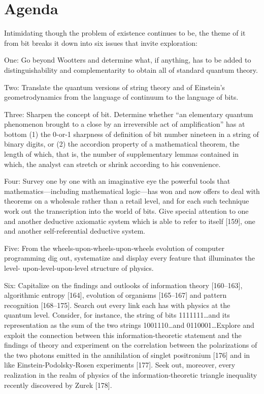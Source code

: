 \documentclass[11pt]{article}
\begin{document}
	\section{Agenda}
	Intimidating though the problem of existence continues to be, the theme of it from
	bit breaks it down into six issues that invite exploration:
	
	One: Go beyond Wootters and determine what, if anything, has to be added to
	distinguishability and complementarity to obtain all of standard quantum theory.
	
	Two: Translate the quantum versions of string theory and of Einstein's geometrodynamics from the language of continuum to the language of bits.
	
	Three: Sharpen the concept of bit. Determine whether ``an elementary quantum
	phenomenon brought to a close by an irreversible act of amplification'' has at bottom
	(1) the 0-or-1 sharpness of definition of bit number nineteen in a string of binary
	digits, or (2) the accordion property of a mathematical theorem, the length of which,
	that is, the number of supplementary lemmas contained in which, the analyst can
	stretch or shrink according to his convenience.
	
	Four: Survey one by one with an imaginative eye the powerful tools that mathematics---including mathematical logic---has won and now offers to deal with
	theorems on a wholesale rather than a retail level, and for each such technique
	work out the transcription into the world of bits. Give special attention to one and
	another deductive axiomatic system which is able to refer to itself [159], one and
	another self-referential deductive system.
	
	Five: From the wheels-upon-wheels-upon-wheels evolution of computer programming dig out, systematize and display every feature that illuminates the level-
	upon-level-upon-level structure of physics.
	
	Six: Capitalize on the findings and outlooks of information theory [160--163],
	algorithmic entropy [164], evolution of organisms [165--167] and pattern recognition [168--175]. Search out every link each has with physics at the quantum level.
	Consider, for instance, the string of bits 1111111\ldots and its representation as the
	sum of the two strings 1001110\ldots and 0110001\ldots Explore and exploit the connection between this information-theoretic statement and the findings of theory and
	experiment on the correlation between the polarizations of the two photons emitted
	in the annihilation of singlet positronium [176] and in like Einstein-Podolsky-Rosen
	experiments [177]. Seek out, moreover, every realization in the realm of physics of
	the information-theoretic triangle inequality recently discovered by Zurek [178].
	
\end{document}
